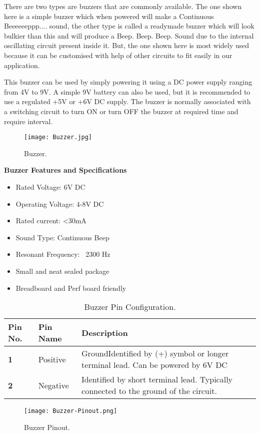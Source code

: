 There are two types are buzzers that are commonly available. The one shown here is a simple buzzer which when powered will make a Continuous Beeeeeeppp.... sound, the other type is called a readymade buzzer which will look bulkier than this and will produce a Beep. Beep. Beep. Sound due to the internal oscillating circuit present inside it. But, the one shown here is most widely used because it can be customised with help of other circuits to fit easily in our application.\vspace{.3cm}

This buzzer can be used by simply powering it using a DC power supply ranging from 4V to 9V. A simple 9V battery can also be used, but it is recommended to use a regulated +5V or +6V DC supply. The buzzer is normally associated with a switching circuit to turn ON or turn OFF the buzzer at required time and require interval.\vspace{.3cm}
\begin{figure}[h]
	\centering
	\texttt{[image: Buzzer.jpg]}
	\caption{Buzzer.}
\end{figure}\vspace{.3cm}

\textbf{Buzzer Features and Specifications}
\begin{itemize}
	\item Rated Voltage: 6V DC
	\item Operating Voltage: 4-8V DC
	\item Rated current: <30mA
	\item Sound Type: Continuous Beep
	\item Resonant Frequency: ~2300 Hz 
	\item Small and neat sealed package
	\item Breadboard and Perf board friendly
\end{itemize}	\vspace{.3cm}
\pagebreak
\begin{table}[h]
	\begin{center}
		
		\begin{tabular}{l|l|l} 
			\textbf{Pin No.} & \textbf{Pin Name} & \textbf{Description} \\
			\hline
			\textbf{1} & Positive & GroundIdentified by (+) symbol or longer terminal lead. Can be powered by 6V DC \\
			\textbf{2} & Negative & Identified by short terminal lead. Typically connected to the ground of the circuit.\\				
		\end{tabular}
		\caption{Buzzer Pin Configuration.}
	\end{center}
\end{table}
\begin{figure}[h]
	\centering
	\texttt{[image: Buzzer-Pinout.png]}
	\caption{Buzzer Pinout.}
\end{figure}
